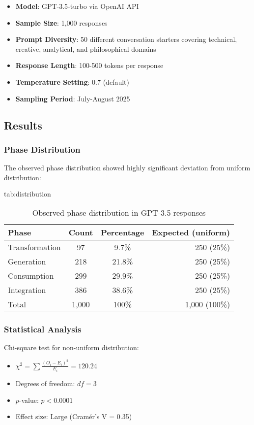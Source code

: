 \documentclass[mlmain]{jmlr}
\begin{document}
\begin{itemize}
\item \textbf{Model}: GPT-3.5-turbo via OpenAI API
\item \textbf{Sample Size}: 1,000 responses
\item \textbf{Prompt Diversity}: 50 different conversation starters covering technical, creative, analytical, and philosophical domains
\item \textbf{Response Length}: 100-500 tokens per response
\item \textbf{Temperature Setting}: 0.7 (default)
\item \textbf{Sampling Period}: July-August 2025
\end{itemize}

\subsection{Results}

\subsubsection{Phase Distribution}

The observed phase distribution showed highly significant deviation from uniform distribution:

\begin{table}[htbp]
\floatconts
  {tab:distribution}
  {\caption{Observed phase distribution in GPT-3.5 responses}}
  {\begin{tabular}{lccr}
  \toprule
  Phase & Count & Percentage & Expected (uniform) \\
  \midrule
  Transformation & 97 & 9.7\% & 250 (25\%) \\
  Generation & 218 & 21.8\% & 250 (25\%) \\
  Consumption & 299 & 29.9\% & 250 (25\%) \\
  Integration & 386 & 38.6\% & 250 (25\%) \\
  \midrule
  Total & 1,000 & 100\% & 1,000 (100\%) \\
  \bottomrule
  \end{tabular}}
\end{table}

\subsubsection{Statistical Analysis}

Chi-square test for non-uniform distribution:
\begin{itemize}
\item $\chi^2 = \sum \frac{(O_i - E_i)^2}{E_i} = 120.24$
\item Degrees of freedom: $df = 3$
\item $p$-value: $p < 0.0001$
\item Effect size: Large (Cram\'er's V = 0.35)
\end{itemize}
\end{document}

